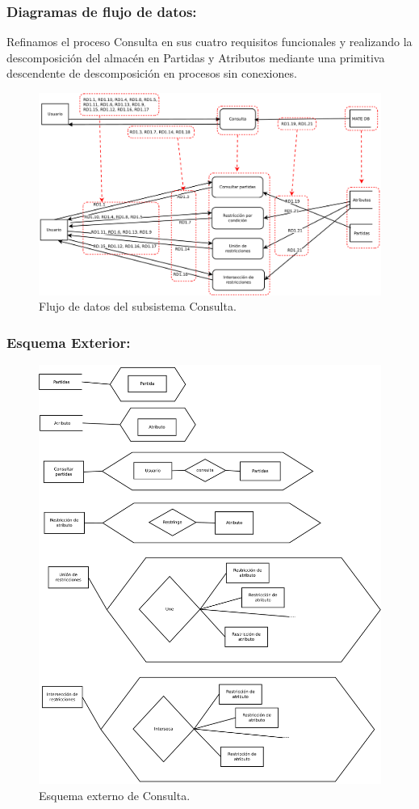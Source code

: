 \subsubsection{Diagramas de flujo de datos:}

Refinamos el proceso Consulta en sus cuatro requisitos funcionales  y realizando la descomposición del almacén en Partidas y Atributos mediante una primitiva descendente de descomposición en procesos sin conexiones.
 
\begin{figure}[h!]
\centering
\includegraphics[width=0.7\linewidth]{../Diagramas/pdf/RefinamientoConsulta.pdf}
\caption{Flujo de datos del subsistema Consulta.}

\label{fig:RefinamientoConsulta}
\end{figure}

\subsubsection{Esquema Exterior:}

\begin{figure}[h!]
	\centering
	\includegraphics[width=0.7\linewidth]{../Diagramas/pdf/EsquemaExternoConsulta.pdf}
	\caption{Esquema externo de Consulta.}
	
	\label{fig:EsquemaExtConsulta}
\end{figure}
